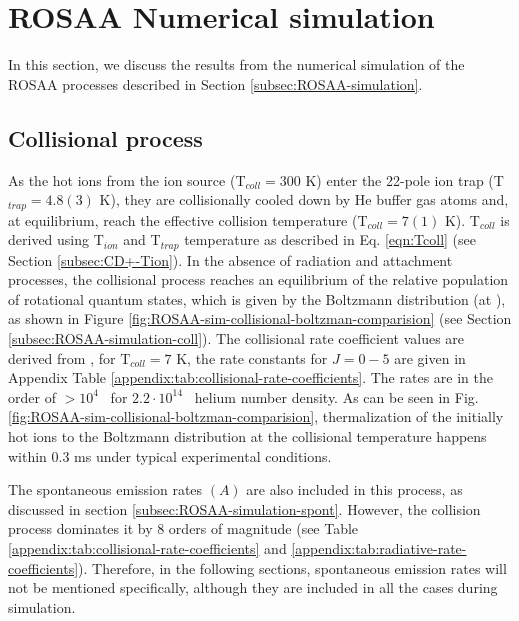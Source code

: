 \section{ROSAA Numerical simulation}
\label{subsec:CD+-kinetics-simulation}

In this section, we discuss the results from the numerical simulation of
the ROSAA processes described in Section
\ref{subsec:ROSAA-simulation}.

\subsection{Collisional process}
\label{subsec:CD+-kinetics-simulation-coll}

As the hot \CD ions from the ion source (T$_{coll}=300$ K) enter the 22-pole
ion trap (T$_{trap}=4.8(3)$ K), they are collisionally cooled down by He buffer
gas atoms and, at equilibrium, reach the effective collision temperature
(T$_{coll}=7(1)$ K). T$_{coll}$ is derived using T$_{ion}$ and T$_{trap}$
temperature as described in Eq. \ref{eqn:Tcoll} (see Section
\ref{subsec:CD+-Tion}). In the absence of radiation and attachment processes,
the collisional process reaches an equilibrium of the relative population of
rotational quantum states, which is given by the Boltzmann distribution (at
\Tcoll), as shown in Figure
\ref{fig:ROSAA-sim-collisional-boltzman-comparision} (see Section
\ref{subsec:ROSAA-simulation-coll}). The collisional rate coefficient values
are derived from \citet{Werfelli2017}, for T$_{coll}=7$ K, the rate constants
for $J=0-5$ are given in Appendix Table
\ref{appendix:tab:collisional-rate-coefficients}. The rates are in the order of
$>10^4$ \pers\ for $2.2 \cdot 10^{14}$ \percc\ helium number density. As can be
seen in Fig. \ref{fig:ROSAA-sim-collisional-boltzman-comparision},
thermalization of the initially hot ions to the Boltzmann distribution at the
collisional temperature happens within 0.3 ms under typical experimental
conditions.



The spontaneous emission rates $(A)$ are also included in this process, as discussed in section \ref{subsec:ROSAA-simulation-spont}. However, the collision process dominates it by $8$ orders of magnitude (see Table \ref{appendix:tab:collisional-rate-coefficients} and \ref{appendix:tab:radiative-rate-coefficients}). Therefore, in the following sections, spontaneous emission rates will not be mentioned specifically, although they are included in all the cases during simulation.

